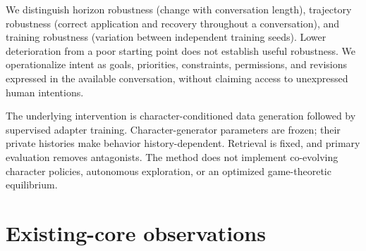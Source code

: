 \documentclass{svproc}
\begin{document}
We distinguish horizon robustness (change with conversation length), trajectory robustness (correct application and recovery throughout a conversation), and training robustness (variation between independent training seeds). Lower deterioration from a poor starting point does not establish useful robustness. We operationalize intent as goals, priorities, constraints, permissions, and revisions expressed in the available conversation, without claiming access to unexpressed human intentions.

The underlying intervention is character-conditioned data generation followed by supervised adapter training. Character-generator parameters are frozen; their private histories make behavior history-dependent. Retrieval is fixed, and primary evaluation removes antagonists. The method does not implement co-evolving character policies, autonomous exploration, or an optimized game-theoretic equilibrium.

\section{Existing-core observations}

\begin{center}\scriptsize
{}
\end{center}
\end{document}
